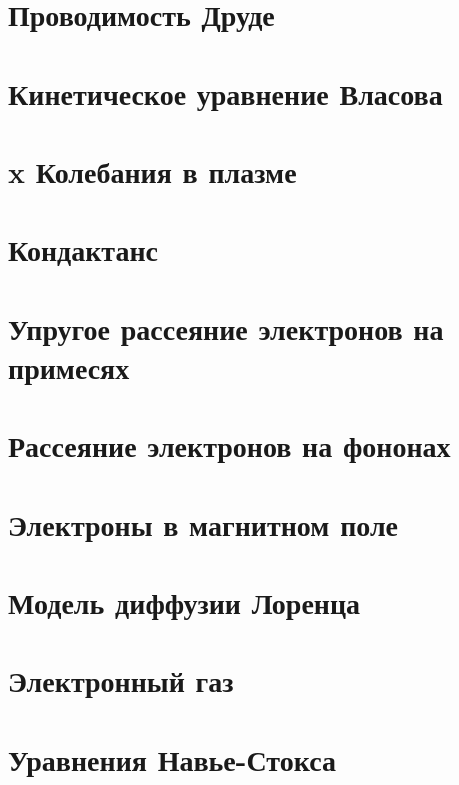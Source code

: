





\section*{Проводимость Друде}


\section{Кинетическое уравнение Власова}


\section{x Колебания в плазме}


\section{Кондактанс}


\section{Упругое рассеяние электронов на примесях}


\section{Рассеяние электронов на фононах}


\section{Электроны в магнитном поле}


\section{Модель диффузии Лоренца}


\section{Электронный газ}


\section{Уравнения Навье-Стокса}





